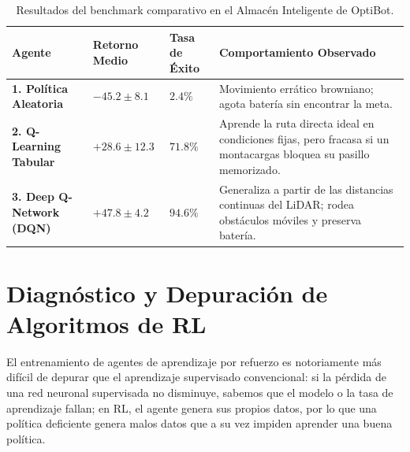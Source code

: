 \begin{table}[htbp]
  \centering
  \small
  \begin{tabular}{@{}p{3.8cm}p{2.8cm}p{3.2cm}p{4.2cm}@{}}
    \toprule
    \textbf{Agente} & \textbf{Retorno Medio} & \textbf{Tasa de Éxito} & \textbf{Comportamiento Observado} \\
    \midrule
    \textbf{1. Política Aleatoria} & $-45.2 \pm 8.1$ & $2.4\%$ & Movimiento errático browniano; agota batería sin encontrar la meta. \\
    \addlinespace
    \textbf{2. Q-Learning Tabular} & $+28.6 \pm 12.3$ & $71.8\%$ & Aprende la ruta directa ideal en condiciones fijas, pero fracasa si un montacargas bloquea su pasillo memorizado. \\
    \addlinespace
    \textbf{3. Deep Q-Network (DQN)} & $\mathbf{+47.8 \pm 4.2}$ & $\mathbf{94.6\%}$ & Generaliza a partir de las distancias continuas del LiDAR; rodea obstáculos móviles y preserva batería. \\
    \bottomrule
  \end{tabular}
  \caption{Resultados del benchmark comparativo en el Almacén Inteligente de OptiBot.}
  \label{tab:benchmark}
\end{table}

\section{Diagnóstico y Depuración de Algoritmos de RL}
El entrenamiento de agentes de aprendizaje por refuerzo es notoriamente más difícil de depurar que el aprendizaje supervisado convencional: si la pérdida de una red neuronal supervisada no disminuye, sabemos que el modelo o la tasa de aprendizaje fallan; en RL, el agente genera sus propios datos, por lo que una política deficiente genera malos datos que a su vez impiden aprender una buena política.

